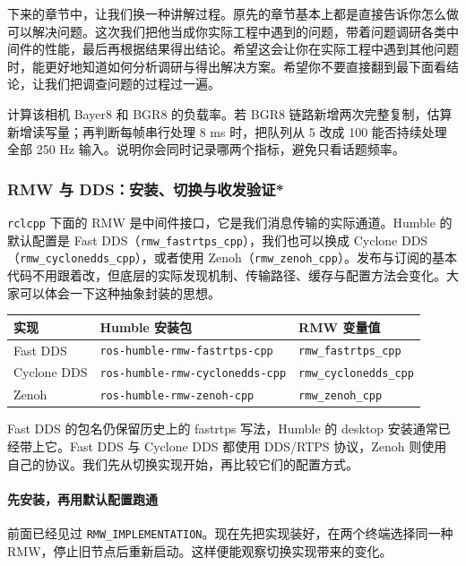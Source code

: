 下来的章节中，让我们换一种讲解过程。原先的章节基本上都是直接告诉你怎么做可以解决问题。这次我们把他当成你实际工程中遇到的问题，带着问题调研各类中间件的性能，最后再根据结果得出结论。希望这会让你在实际工程中遇到其他问题时，能更好地知道如何分析调研与得出解决方案。希望你不要直接翻到最下面看结论，让我们把调查问题的过程过一遍。

\begin{exercise}
\label{ex:v2-ros-image-budget}
计算该相机 Bayer8 和 BGR8 的负载率。若 BGR8 链路新增两次完整复制，估算新增读写量；再判断每帧串行处理 8 ms 时，把队列从 5 改成 100 能否持续处理全部 250 Hz 输入。说明你会同时记录哪两个指标，避免只看话题频率。
\end{exercise}

\subsubsection{RMW 与 DDS：安装、切换与收发验证*}
\label{sec:ros2-rmw-selection}
\texttt{rclcpp} 下面的 RMW 是中间件接口，它是我们消息传输的实际通道。Humble 的默认配置是 Fast DDS（\nolinkurl{rmw_fastrtps_cpp}），我们也可以换成 Cyclone DDS（\nolinkurl{rmw_cyclonedds_cpp}），或者使用 Zenoh（\nolinkurl{rmw_zenoh_cpp}）。发布与订阅的基本代码不用跟着改，但底层的实际发现机制、传输路径、缓存与配置方法会变化。大家可以体会一下这种抽象封装的思想。

\begin{center}
\begin{tabular}{p{}p{}p{}}
\toprule[1.5pt]
实现 & Humble 安装包 & RMW 变量值 \\
\midrule[1pt]
Fast DDS & \nolinkurl{ros-humble-rmw-fastrtps-cpp} & \nolinkurl{rmw_fastrtps_cpp} \\
Cyclone DDS & \nolinkurl{ros-humble-rmw-cyclonedds-cpp} & \nolinkurl{rmw_cyclonedds_cpp} \\
Zenoh & \nolinkurl{ros-humble-rmw-zenoh-cpp} & \nolinkurl{rmw_zenoh_cpp} \\
\bottomrule[1.5pt]
\end{tabular}
\end{center}

Fast DDS 的包名仍保留历史上的 fastrtps 写法，Humble 的 desktop 安装通常已经带上它。Fast DDS 与 Cyclone DDS 都使用 DDS/RTPS 协议，Zenoh 则使用自己的协议。我们先从切换实现开始，再比较它们的配置方式。

\paragraph*{先安装，再用默认配置跑通}
前面已经见过 \texttt{RMW\_IMPLEMENTATION}。现在先把实现装好，在两个终端选择同一种 RMW，停止旧节点后重新启动。这样便能观察切换实现带来的变化。

